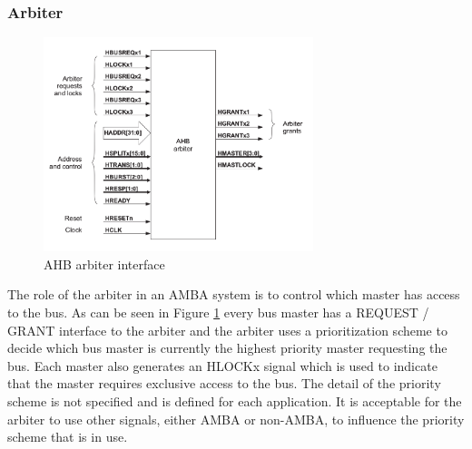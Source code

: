 \subsubsection{Arbiter}
\begin{figure}[ht]
    \centering
    \includegraphics[width=0.7\textwidth]{figures/others/arbiter_ahb.png}
    \caption{AHB arbiter interface}
    \label{fig:arbiterint}
\end{figure}
 The role of the arbiter in an AMBA system is to control which master has access to the bus. As can be seen in Figure \ref{fig:arbiterint} every bus master has a REQUEST / GRANT interface to the arbiter and the arbiter uses a prioritization scheme to decide which bus master is currently the highest priority master requesting the bus. Each master also generates an HLOCKx signal which is used to indicate that the master requires exclusive access to the bus. The detail of the priority scheme is not specified and is defined for each application. It is acceptable for the arbiter to use other signals, either AMBA or non-AMBA, to influence the priority scheme that is in use.

 
